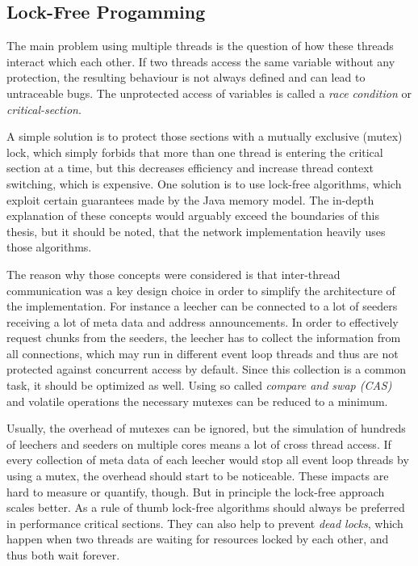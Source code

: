 \subsection{Lock-Free Progamming}
\label{subsec:lockfree}
The main problem using multiple threads is the question of how these threads interact which each other. If two threads access the same variable without any protection, the resulting behaviour is not always defined and can lead to untraceable bugs. The unprotected access of variables is called a \emph{race condition} or \emph{critical-section}.

A simple solution is to protect those sections with a mutually exclusive (mutex) lock, which simply forbids that more than one thread is entering the critical section at a time, but this decreases efficiency and increase thread context switching, which is expensive. One solution is to use lock-free algorithms, which exploit certain guarantees made by the Java memory model. The in-depth explanation of these concepts would arguably exceed the boundaries of this thesis, but it should be noted, that the network implementation heavily uses those algorithms.

The reason why those concepts were considered is that inter-thread communication was a key design choice in order to simplify the architecture of the implementation. For instance a leecher can be connected to a lot of seeders receiving a lot of meta data and address announcements. In order to effectively request chunks from the seeders, the leecher has to collect the information from all connections, which may run in different event loop threads and thus are not protected against concurrent access by default. Since this collection is a common task, it should be optimized as well. Using so called \emph{compare and swap (CAS)} and volatile operations the necessary mutexes can be reduced to a minimum. 

Usually, the overhead of mutexes can be ignored, but the simulation of hundreds of leechers and seeders on multiple cores means a lot of cross thread access. If every collection of meta data of each leecher would stop all event loop threads by using a mutex, the overhead should start to be noticeable. These impacts are hard to measure or quantify, though. But in principle the lock-free approach scales better. As a rule of thumb lock-free algorithms should always be preferred in performance critical sections. They can also help to prevent \emph{dead locks}, which happen when two threads are waiting for resources locked by each other, and thus both wait forever.

